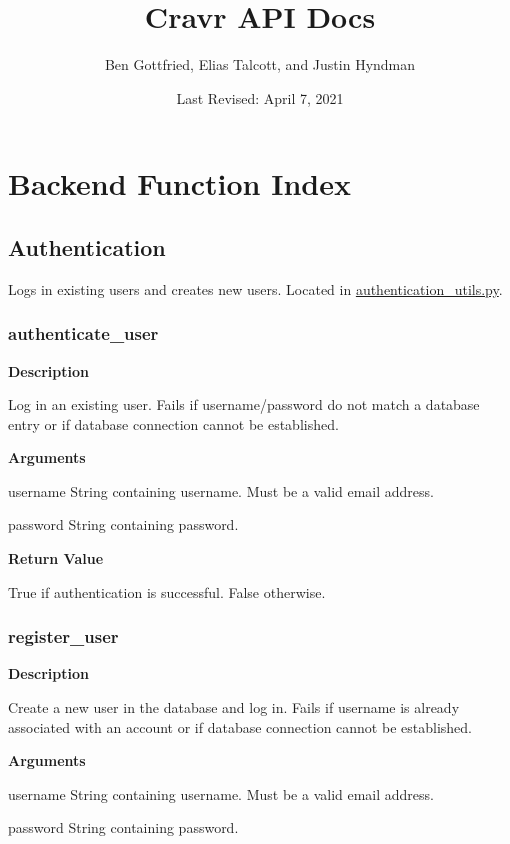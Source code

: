 \documentclass[11pt]{article}
\def \myTitle {Cravr API Docs}
\def \myName {Ben Gottfried, Elias Talcott, and Justin Hyndman}
\def \myDate {Last Revised: April 7, 2021}
\begin{document}
\begin{titlepage}
\title{\myTitle}
\author{\myName}
\date{\myDate}
\maketitle
\vspace{-4ex}
\tableofcontents
\thispagestyle{empty}
\end{titlepage}


\section{Backend Function Index}
\subsection{Authentication}
Logs in existing users and creates new users. Located in \url{authentication\_utils.py}.

\subsubsection{authenticate\_user}
\textbf{Description}

Log in an existing user. Fails if username/password do not match a database entry or if database connection cannot be established.

\textbf{Arguments}
\begin{deflist}
	\item[username]String containing username. Must be a valid email address.
	\item[password]String containing password.
\end{deflist}

\textbf{Return Value}

True if authentication is successful. False otherwise.

\subsubsection{register\_user}
\textbf{Description}

Create a new user in the database and log in. Fails if username is already associated with an account or if database connection cannot be established.

\textbf{Arguments}
\begin{deflist}
	\item[username]String containing username. Must be a valid email address.
	\item[password]String containing password.
\end{deflist}
\end{document}
